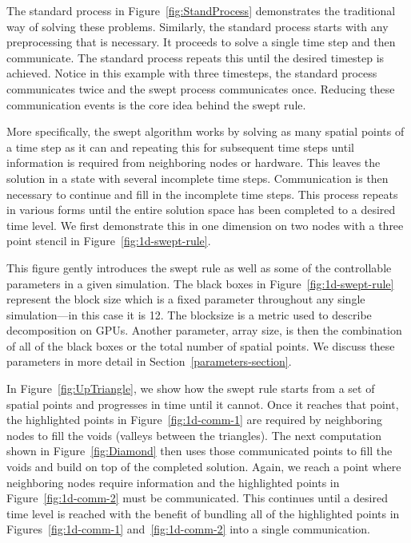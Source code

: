 \documentclass[mca,article,submit,moreauthors,pdftex]{Definitions/mdpi}
\begin{document}
\begin{paracol}{2}
\linenumbers
\switchcolumn

The standard process in Figure~\ref{fig:StandProcess} demonstrates the traditional way of solving these problems. Similarly, the standard process starts with any preprocessing that is necessary. It proceeds to solve a single time step and then communicate. The standard process repeats this until the desired timestep is achieved. Notice in this example with three timesteps, the standard process communicates twice and the swept process communicates once. Reducing these communication events is the core idea behind the swept rule.

More specifically, the swept algorithm works by solving as many spatial points of a time step as it can and repeating this for subsequent time steps until information is required from neighboring nodes or hardware. This leaves the solution in a state with several incomplete time steps. Communication is then necessary to continue and fill in the incomplete time steps. This process repeats in various forms until the entire solution space has been completed to a desired time level. We first demonstrate this in one dimension on two nodes with a three point stencil in Figure~\ref{fig:1d-swept-rule}. 

This figure gently introduces the swept rule as well as some of the controllable parameters in a given simulation. The black boxes in Figure~\ref{fig:1d-swept-rule} represent the block size which is a fixed parameter throughout any single simulation---in this case it is 12. The blocksize is a metric used to describe decomposition on GPUs. Another parameter, array size, is then the combination of all of the black boxes or the total number of spatial points. We discuss these parameters in more detail in Section~\ref{parameters-section}.

In Figure~\ref{fig:UpTriangle}, we show how the swept rule starts from a set of spatial points and progresses in time until it cannot. Once it reaches that point, the highlighted points in Figure~\ref{fig:1d-comm-1} are required by neighboring nodes to fill the voids (valleys between the triangles). The next computation shown in Figure~\ref{fig:Diamond} then uses those communicated points to fill the voids and build on top of the completed solution. Again, we reach a point where neighboring nodes require information and the highlighted points in Figure~\ref{fig:1d-comm-2} must be communicated. This continues until a desired time level is reached with the benefit of bundling all of the highlighted points in Figures~\ref{fig:1d-comm-1} and~\ref{fig:1d-comm-2} into a single communication.

\end{paracol}
\nointerlineskip
\end{document}
